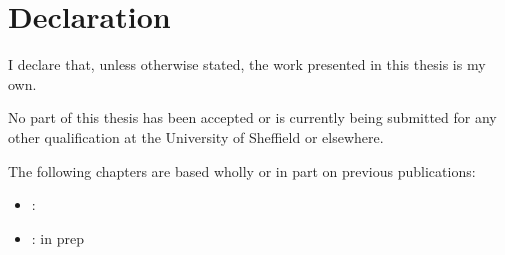 \chapter*{Declaration}

\begin{onehalfspace}

\noindent I declare that, unless otherwise stated, the work presented in this thesis is my own.

\bigskip

\noindent No part of this thesis has been accepted or is currently being submitted for any other qualification at the University of Sheffield or elsewhere.

\bigskip

\noindent The following chapters are based wholly or in part on previous publications:

\begin{itemize}
    \item {}: \citet{example}
    \item {}: in prep
\end{itemize}

\end{onehalfspace}